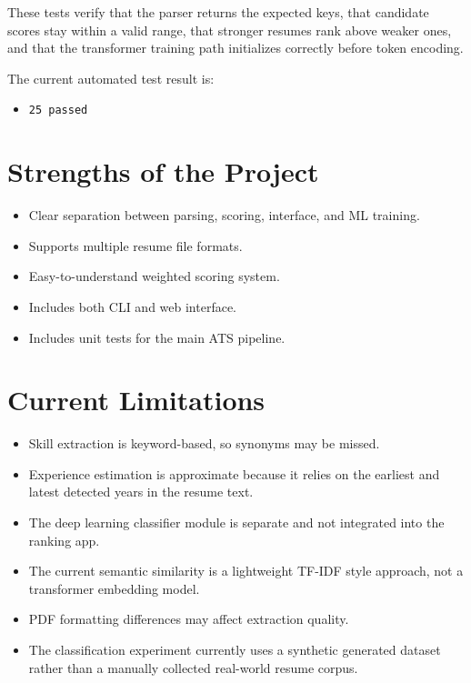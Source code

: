 \documentclass[12pt,a4paper]{article}
\begin{document}
These tests verify that the parser returns the expected keys, that candidate scores stay within a valid range, that stronger resumes rank above weaker ones, and that the transformer training path initializes correctly before token encoding.

The current automated test result is:
\begin{itemize}[leftmargin=1.5em]
    \item \texttt{25 passed}
\end{itemize}

\section{Strengths of the Project}
\begin{itemize}[leftmargin=1.5em]
    \item Clear separation between parsing, scoring, interface, and ML training.
    \item Supports multiple resume file formats.
    \item Easy-to-understand weighted scoring system.
    \item Includes both CLI and web interface.
    \item Includes unit tests for the main ATS pipeline.
\end{itemize}

\section{Current Limitations}
\begin{itemize}[leftmargin=1.5em]
    \item Skill extraction is keyword-based, so synonyms may be missed.
    \item Experience estimation is approximate because it relies on the earliest and latest detected years in the resume text.
    \item The deep learning classifier module is separate and not integrated into the ranking app.
    \item The current semantic similarity is a lightweight TF-IDF style approach, not a transformer embedding model.
    \item PDF formatting differences may affect extraction quality.
    \item The classification experiment currently uses a synthetic generated dataset rather than a manually collected real-world resume corpus.
\end{itemize}
\end{document}
